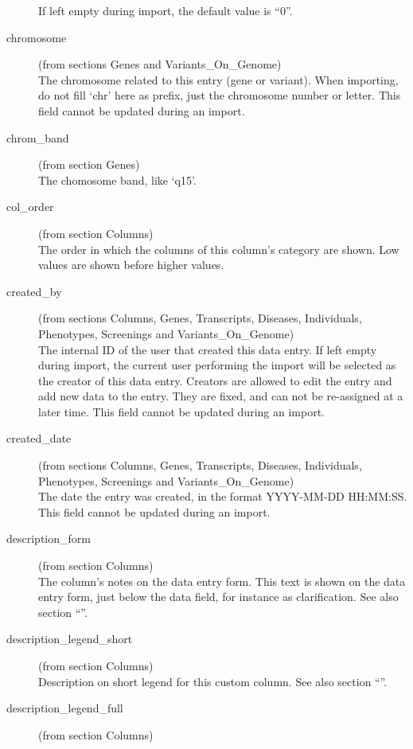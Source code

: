 \begin{description}
  If left empty during import, the default value is ``0''.
  \item[chromosome] (from sections Genes and Variants\_On\_Genome)\hfill \\
  The chromosome related to this entry (gene or variant).
  When importing, do not fill `chr' here as prefix, just the chromosome number or letter.
  This field cannot be updated during an import.
  \item[chrom\_band] (from section Genes)\hfill \\
  The chomosome band, like `q15'.
  \item[col\_order] (from section Columns)\hfill \\
  The order in which the columns of this column's category are shown.
  Low values are shown before higher values.
  \item[created\_by] (from sections Columns, Genes, Transcripts, Diseases, Individuals, Phenotypes,
   Screenings and Variants\_On\_Genome)\hfill \\
  The internal ID of the user that created this data entry.
  If left empty during import, the current user performing the import will be selected
   as the creator of this data entry.
  Creators are allowed to edit the entry and add new data to the entry.
  They are fixed, and can not be re-assigned at a later time.
  This field cannot be updated during an import.
  \item[created\_date] (from sections Columns, Genes, Transcripts, Diseases, Individuals, Phenotypes,
   Screenings and Variants\_On\_Genome)\hfill \\
  The date the entry was created, in the format YYYY-MM-DD HH:MM:SS.
  This field cannot be updated during an import.
  \item[description\_form] (from section Columns)\hfill \\
  The column's notes on the data entry form.
  This text is shown on the data entry form, just below the data field, for instance as clarification.
  See also section ``''.
  \item[description\_legend\_short] (from section Columns)\hfill \\
  Description on short legend for this custom column.
  See also section ``''.
  \item[description\_legend\_full] (from section Columns)\hfill \\

\end{description}
